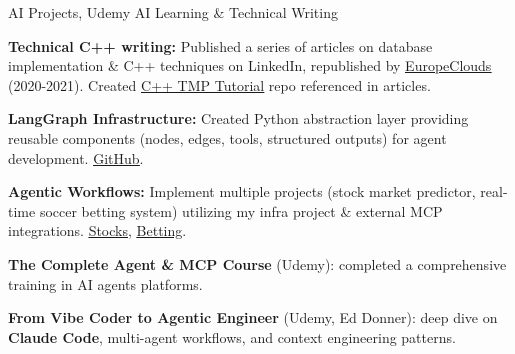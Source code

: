 \begin{cventries}
  \cventry
    {}
    {AI Projects, Udemy AI Learning \& Technical Writing}
    {}
    {}
    {
      \begin{cvitems}
        \item \textbf{Technical C++ writing:} Published a series of articles on database implementation \& C++ techniques on LinkedIn, republished by \href{https://www.europeclouds.com/authors/omer-pinto}{\color{awesome}\underline{EuropeClouds}} (2020-2021). Created \href{https://github.com/Omer-Pinto/TMP-Tutorial/}{\color{awesome}\underline{C++ TMP Tutorial}} repo referenced in articles.
        \item \textbf{LangGraph Infrastructure:} Created Python abstraction layer providing reusable components (nodes, edges, tools, structured outputs) for agent development. \href{https://github.com/Omer-Pinto/LangGraphWrappers}{\color{awesome}\underline{GitHub}}.
        \item \textbf{Agentic Workflows:} Implement multiple projects (stock market predictor, real-time soccer betting system) utilizing my infra project \& external MCP integrations. \href{https://github.com/Omer-Pinto/StocksMarketRecommender}{\color{awesome}\underline{Stocks}}, \href{https://github.com/Omer-Pinto/SoccerSmartBet}{\color{awesome}\underline{Betting}}.
        \item \textbf{The Complete Agent \& MCP Course} (Udemy): completed a comprehensive training in AI agents platforms.
        \item \textbf{From Vibe Coder to Agentic Engineer} (Udemy, Ed Donner): deep dive on \textbf{Claude Code}, multi-agent workflows, and context engineering patterns.
      \end{cvitems}
    }
\end{cventries}